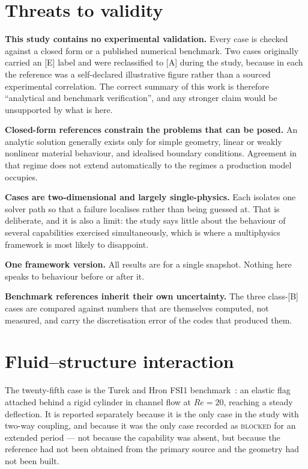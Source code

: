 \documentclass[11pt,a4paper]{article}
\begin{document}
\section{Threats to validity}
\label{sec:limits}

\textbf{This study contains no experimental validation.} Every case is checked
against a closed form or a published numerical benchmark. Two cases originally
carried an [E] label and were reclassified to [A] during the study, because in
each the reference was a self-declared illustrative figure rather than a sourced
experimental correlation. The correct summary of this work is therefore
``analytical and benchmark verification'', and any stronger claim would be
unsupported by what is here.

\textbf{Closed-form references constrain the problems that can be posed.} An
analytic solution generally exists only for simple geometry, linear or weakly
nonlinear material behaviour, and idealised boundary conditions. Agreement in
that regime does not extend automatically to the regimes a production model
occupies.

\textbf{Cases are two-dimensional and largely single-physics.} Each isolates one
solver path so that a failure localises rather than being guessed at. That is
deliberate, and it is also a limit: the study says little about the behaviour of
several capabilities exercised simultaneously, which is where a multiphysics
framework is most likely to disappoint.

\textbf{One framework version.} All results are for a single snapshot. Nothing
here speaks to behaviour before or after it.

\textbf{Benchmark references inherit their own uncertainty.} The three class-[B]
cases are compared against numbers that are themselves computed, not measured,
and carry the discretisation error of the codes that produced them.

\section{Fluid--structure interaction}
\label{sec:fsi}

The twenty-fifth case is the Turek and Hron FSI1 benchmark~\cite{turek2006}: an
elastic flag attached behind a rigid cylinder in channel flow at $Re=20$,
reaching a steady deflection. It is reported separately because it is the only
case in the study with two-way coupling, and because it was the only case
recorded as \textsc{blocked} for an extended period --- not because the
capability was absent, but because the reference had not been obtained from the
primary source and the geometry had not been built.
\end{document}
